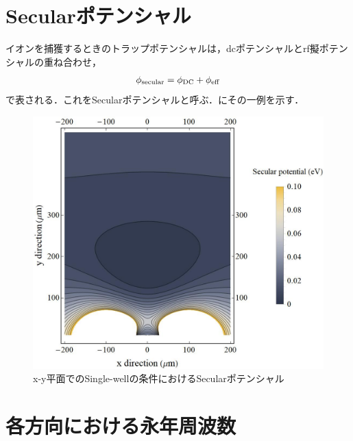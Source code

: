 \section{Secularポテンシャル}
イオンを捕獲するときのトラップポテンシャルは，dcポテンシャルとrf擬ポテンシャルの重ね合わせ，
\large
\begin{align}
	\phi_{\rm secular} = \phi_{\rm DC} + \phi_{\rm eff}
\end{align}
\normalsize
で表される．これをSecularポテンシャルと呼ぶ．にその一例を示す．
\begin{figure}[h]
	\begin{center}
		\includegraphics[width = 0.7\linewidth]{./simulation/figure/Secular_pot_xy.jpg}
		\caption{x-y平面でのSingle-wellの条件におけるSecularポテンシャル}
		\label{fig:SecPot_single-well}
	\end{center}
\end{figure}

\section{各方向における永年周波数}